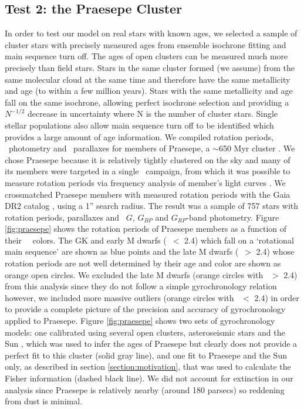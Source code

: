 \subsection{Test 2: the Praesepe Cluster}
In order to test our model on real stars with known ages, we selected a sample
of cluster stars with precisely measured ages from ensemble isochrone fitting
and main sequence turn off.
The ages of open clusters can be measured much more precisely than field
stars.
Stars in the same cluster formed (we assume) from the same molecular cloud at
the same time and therefore have the same metallicity and age (to within a few
million years).
Stars with the same metallicity and age fall on the same isochrone,
allowing perfect isochrone selection and providing a $N^{-1/2}$ decrease in
uncertainty where N is the number of cluster stars.
Single stellar populations also allow main sequence turn off to be identified
which provides a large amount of age information.
We compiled rotation periods, \Gaia\ photometry and \gaia\ parallaxes for
members of Praesepe, a $\sim$650 Myr cluster \citep{fossati2008}.
We chose Praesepe because it is relatively tightly clustered on the sky and
many of its members were targeted in a single \ktwo\ campaign, from which it
was possible to measure rotation periods via frequency analysis of member's
light curves \citep{douglas2017}.
We crossmatched Praesepe members with measured rotation periods
\citep{douglas2017} with the Gaia DR2 catalog \citep{brown2018}, using a 1''
search radius.
The result was a sample of 757 stars with rotation periods, parallaxes and
\gaia\ $G$, $G_{BP}$ and $G_{RP}$-band photometry.
Figure \ref{fig:praesepe} shows the rotation periods of Praesepe members as
a function of their \gaia\ \gcolor\ colors.
The GK and early M dwarfs (\gcolor\ $<$ 2.4) which fall on a `rotational main
sequence' are shown as blue points and the late M dwarfs (\gcolor\ $>$ 2.4)
whose rotation periods are not well determined by their age and color are
shown as orange open circles.
We excluded the late M dwarfs (orange circles with \gcolor\ $>$ 2.4) from this
analysis since they do not follow a simple gyrochronology relation however, we
included more massive outliers (orange circles with \gcolor\ $<$ 2.4) in order
to provide a complete picture of the precision and accuracy of gyrochronology
applied to Praesepe.
Figure \ref{fig:praesepe} shows two sets of gyrochronology models: one
calibrated using several open clusters, asteroseismic stars and the Sun
\citep{angus2015}, which was used to infer the ages of Praesepe but clearly
does not provide a perfect fit to this cluster (solid gray line), and one fit
to Praesepe and the Sun only, as described in section
\ref{section:motivation}, that was used to calculate the Fisher information
(dashed black line).
We did not account for extinction in our analysis since Praesepe is relatively
nearby (around 180 parsecs) so reddening from dust is minimal.

